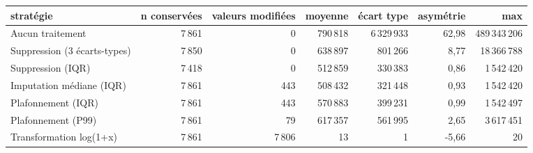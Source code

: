 \begin{tabular}{lrrrrrr}
\toprule
\textbf{stratégie} & \textbf{n conservées} & \textbf{valeurs modifiées} & \textbf{moyenne} & \textbf{écart type} & \textbf{asymétrie} & \textbf{max} \\
\midrule
Aucun traitement & 7\,861 & 0 & 790\,818 & 6\,329\,933 & 62,98 & 489\,343\,206 \\
Suppression (3 écarts-types) & 7\,850 & 0 & 638\,897 & 801\,266 & 8,77 & 18\,366\,788 \\
Suppression (IQR) & 7\,418 & 0 & 512\,859 & 330\,383 & 0,86 & 1\,542\,420 \\
Imputation médiane (IQR) & 7\,861 & 443 & 508\,432 & 321\,448 & 0,93 & 1\,542\,420 \\
Plafonnement (IQR) & 7\,861 & 443 & 570\,883 & 399\,231 & 0,99 & 1\,542\,497 \\
Plafonnement (P99) & 7\,861 & 79 & 617\,357 & 561\,995 & 2,65 & 3\,617\,451 \\
Transformation log(1+x) & 7\,861 & 7\,806 & 13 & 1 & -5,66 & 20 \\
\bottomrule
\end{tabular}
